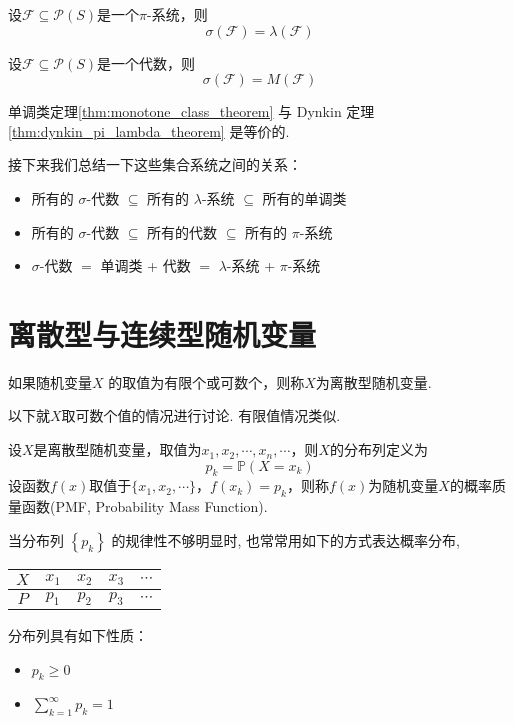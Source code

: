 \begin{theorem}\label{thm:dynkin_pi_lambda_theorem}
    设$\mathcal{F}\subseteq \mathcal{P}(S)$是一个$\pi$-系统，则
    $$
        \sigma(\mathcal{F})=\lambda(\mathcal{F})
    $$
\end{theorem}

\begin{theorem}[单调类定理]\label{thm:monotone_class_theorem}
    设$\mathcal{F}\subseteq \mathcal{P}(S)$是一个代数，则
    $$
        \sigma(\mathcal{F})=M(\mathcal{F})
    $$
\end{theorem}

\begin{theorem}
    单调类定理\ref{thm:monotone_class_theorem} 与 Dynkin 定理\ref{thm:dynkin_pi_lambda_theorem} 是等价的.
\end{theorem}

接下来我们总结一下这些集合系统之间的关系：
\begin{itemize}
    \item 所有的 $\sigma$-代数 $\subseteq$ 所有的 $\lambda$-系统 $\subseteq$ 所有的单调类
    \item 所有的 $\sigma$-代数 $\subseteq$ 所有的代数 $\subseteq$ 所有的 $\pi$-系统
    \item $\sigma$-代数 $=$ 单调类 + 代数 $=$ $\lambda$-系统 + $\pi$-系统
\end{itemize}

\section{离散型与连续型随机变量}

\begin{definition}[离散型随机变量]
    如果随机变量$X$ 的取值为有限个或可数个，则称$X$为离散型随机变量.
\end{definition}

以下就$X$取可数个值的情况进行讨论. 有限值情况类似.

设$X$是离散型随机变量，取值为$x_1,x_2,\cdots,x_n,\cdots$，则$X$的分布列定义为
$$
    p_k=\mathbb{P}(X=x_k)
$$
设函数$f(x)$取值于$\{x_1,x_2,\cdots\}$，$f(x_k)=p_k$，则称$f(x)$为随机变量$X$的概率质量函数(PMF, Probability Mass Function).

当分布列 $\left\{p_k\right\}$ 的规律性不够明显时, 也常常用如下的方式表达概率分布,
\begin{tabular}{c|cccc}
    $X$       & $x_1$ & $x_2$ & $x_3$ & $\cdots$ \\
    \hline$P$ & $p_1$ & $p_2$ & $p_3$ & $\cdots$
\end{tabular}
分布列具有如下性质：
\begin{itemize}
    \item $p_k\ge 0$
    \item $\sum_{k=1}^{\infty} p_k=1$
\end{itemize}


